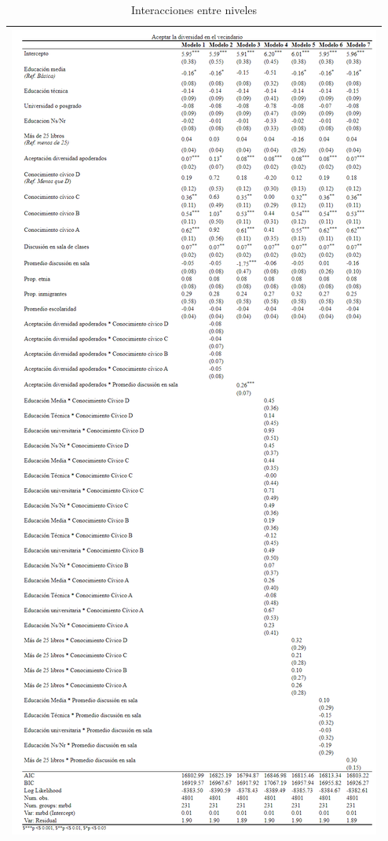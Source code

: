 \documentclass[12pt,twoside]{templates/facsothesis}
\begin{document}
\begin{longtable}[]{@{}l@{}}
\caption{\label{tab:interact}Interacciones entre niveles}\tabularnewline
\toprule()
\endhead
\includegraphics{IPO/output/tables/interac.png} \\
\bottomrule()
\end{longtable}
\end{document}
